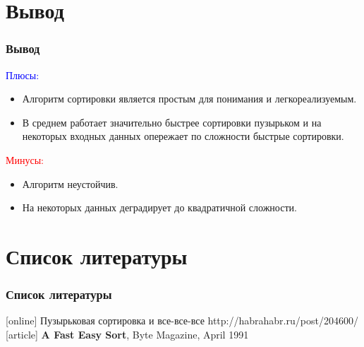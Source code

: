 \documentclass{beamer}
\begin{document}
\section{Вывод}
\begin{frame}
    \frametitle{Вывод}
    \textcolor{blue}{Плюсы:}
    \begin{itemize}
    	\item{Алгоритм сортировки является простым для понимания и легкореализуемым.}
	\item{В среднем работает значительно быстрее сортировки пузырьком и на некоторых входных данных опережает по сложности быстрые сортировки.}
    \end{itemize}
    \textcolor{red}{Минусы:}
    \begin{itemize}
    	\item{Алгоритм неустойчив.}
	\item{На некоторых данных деградирует до квадратичной сложности.}
    \end{itemize}

\end{frame}

\section{Список литературы}
\begin{frame}
    \frametitle{Список литературы}
    \begin{thebibliography}{3}
        [online]
         {Пузырьковая сортировка и все-все-все} {\tiny{http://habrahabr.ru/post/204600/}}
        [article]
         {\bf A Fast Easy Sort},
            Byte Magazine, April 1991
    \end{thebibliography}
\end{frame}
\end{document}
